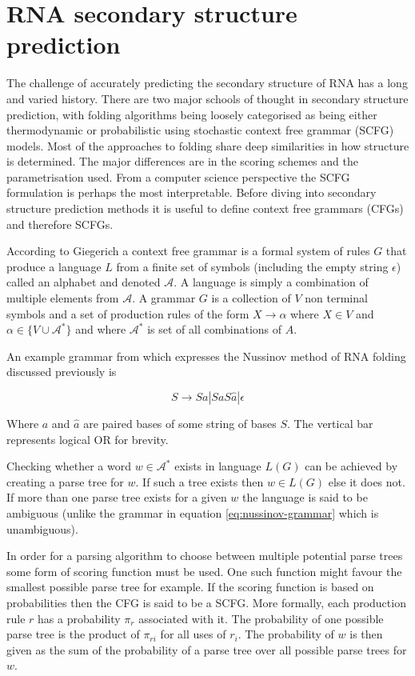 \documentclass[journal]{IEEEtran}
\begin{document}
\section{RNA secondary structure prediction}
\label{sec:rna-secondary-structure}
The challenge of accurately predicting the secondary structure of RNA has a long and varied history. There are two major schools of thought in secondary structure prediction, with folding algorithms being loosely categorised as being either thermodynamic or probabilistic using stochastic context free grammar (SCFG) models. Most of the approaches to folding share deep similarities in how structure is determined. The major differences are in the scoring schemes and the parametrisation used. From a computer science perspective the SCFG formulation is perhaps the most interpretable. Before diving into secondary structure prediction methods it is useful to define context free grammars (CFGs) and therefore SCFGs. 

According to Giegerich\cite{giegerich2014introduction} a context free grammar is a formal system of rules $G$ that produce a language $L$ from a finite set of symbols (including the empty string $\epsilon$) called an alphabet and denoted $\mathcal{A}$. A language is simply a combination of multiple elements from $\mathcal{A}$. A grammar $G$ is a collection of $V$ non terminal symbols and a set of production rules of the form $X \rightarrow \alpha$ where $X \in V$ and $\alpha \in \{V \cup \mathcal{A}^*\}$ and where $\mathcal{A}^*$ is set of all combinations of $A$.

An example grammar from \cite{rivas2013four} which expresses the Nussinov method \cite{nussinov1980fast} of RNA folding discussed previously is

\begin{equation}
	\label{eq:nussinov-grammar}
	S \rightarrow S a | S a S \hat{a} | \epsilon
\end{equation} 

Where $a$ and $\hat{a}$ are paired bases of some string of bases $S$. The vertical bar represents logical OR for brevity.

Checking whether a word $w \in \mathcal{A}^*$ exists in language $L(G)$ can be achieved by creating a parse tree for $w$. If such a tree exists then $w \in L(G)$ else it does not. If more than one parse tree exists for a given $w$ the language is said to be ambiguous (unlike the grammar in equation \ref{eq:nussinov-grammar} which is unambiguous).

In order for a parsing algorithm to choose between multiple potential parse trees some form of scoring function must be used. One such function might favour the smallest possible parse tree for example. If the scoring function is based on probabilities then the CFG is said to be a SCFG. More formally, each production rule $r$ has a probability $\pi_r$ associated with it. The probability of one possible parse tree is the product of $\pi_{ri}$ for all uses of $r_i$. The probability of $w$ is then given as the sum of the probability of a parse tree over all possible parse trees for $w$.
\end{document}
